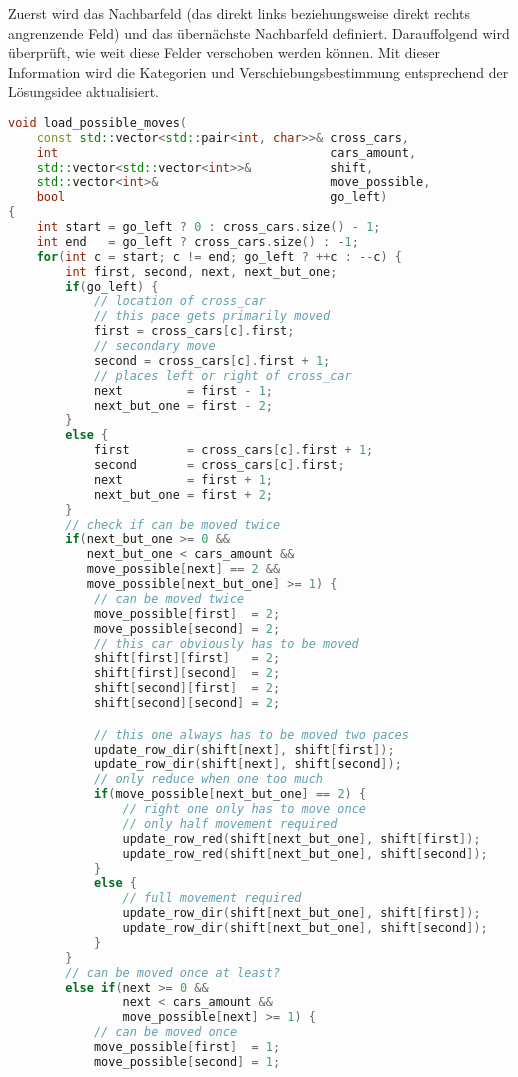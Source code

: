 \documentclass[a4paper,10pt,ngerman]{scrartcl}
\begin{document}
Zuerst wird das Nachbarfeld (das direkt links beziehungsweise direkt rechts angrenzende Feld) und das übernächste Nachbarfeld definiert.
Darauffolgend wird überprüft, wie weit diese Felder verschoben werden können.
Mit dieser Information wird die Kategorien und Verschiebungsbestimmung entsprechend der Lösungsidee aktualisiert.
\begin{lstlisting}[language=C++]
void load_possible_moves(
    const std::vector<std::pair<int, char>>& cross_cars,
    int                                      cars_amount,
    std::vector<std::vector<int>>&           shift,
    std::vector<int>&                        move_possible,
    bool                                     go_left)
{
    int start = go_left ? 0 : cross_cars.size() - 1;
    int end   = go_left ? cross_cars.size() : -1;
    for(int c = start; c != end; go_left ? ++c : --c) {
        int first, second, next, next_but_one;
        if(go_left) {
            // location of cross_car
            // this pace gets primarily moved
            first = cross_cars[c].first;
            // secondary move
            second = cross_cars[c].first + 1;
            // places left or right of cross_car
            next         = first - 1;
            next_but_one = first - 2;
        }
        else {
            first        = cross_cars[c].first + 1;
            second       = cross_cars[c].first;
            next         = first + 1;
            next_but_one = first + 2;
        }
        // check if can be moved twice
        if(next_but_one >= 0 &&
           next_but_one < cars_amount &&
           move_possible[next] == 2 &&
           move_possible[next_but_one] >= 1) {
            // can be moved twice
            move_possible[first]  = 2;
            move_possible[second] = 2;
            // this car obviously has to be moved
            shift[first][first]   = 2;
            shift[first][second]  = 2;
            shift[second][first]  = 2;
            shift[second][second] = 2;

            // this one always has to be moved two paces
            update_row_dir(shift[next], shift[first]);
            update_row_dir(shift[next], shift[second]);
            // only reduce when one too much
            if(move_possible[next_but_one] == 2) {
                // right one only has to move once
                // only half movement required
                update_row_red(shift[next_but_one], shift[first]);
                update_row_red(shift[next_but_one], shift[second]);
            }
            else {
                // full movement required
                update_row_dir(shift[next_but_one], shift[first]);
                update_row_dir(shift[next_but_one], shift[second]);
            }
        }
        // can be moved once at least?
        else if(next >= 0 &&
                next < cars_amount &&
                move_possible[next] >= 1) {
            // can be moved once
            move_possible[first]  = 1;
            move_possible[second] = 1;


\end{lstlisting}
\end{document}
